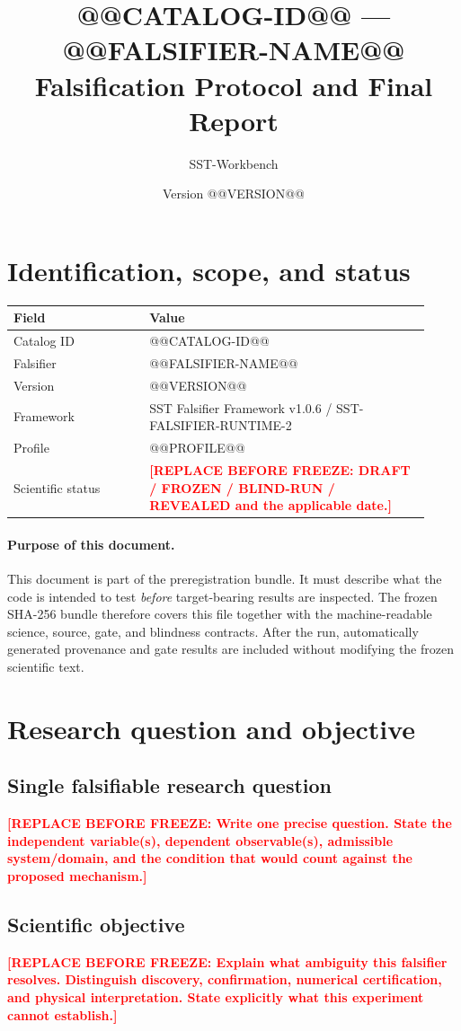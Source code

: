 \documentclass[11pt,a4paper]{article}
\title{@@CATALOG-ID@@ --- @@FALSIFIER-NAME@@\\Falsification Protocol and Final Report}
\author{SST-Workbench}
\date{Version @@VERSION@@}
\newcommand{\SSTTODO}[1]{\ifmmode\text{\color{red}\bfseries TODO}\else\textcolor{red}{\textbf{[REPLACE BEFORE FREEZE: #1]}}\fi}
\begin{document}
\maketitle

\section{Identification, scope, and status}
\begin{longtable}{p{0.30\linewidth}p{0.62\linewidth}}
\toprule
Field & Value \\
\midrule
Catalog ID & @@CATALOG-ID@@ \\
Falsifier & @@FALSIFIER-NAME@@ \\
Version & @@VERSION@@ \\
Framework & SST Falsifier Framework v1.0.6 / SST-FALSIFIER-RUNTIME-2 \\
Profile & @@PROFILE@@ \\
Scientific status & \SSTTODO{DRAFT / FROZEN / BLIND-RUN / REVEALED and the applicable date.} \\
\bottomrule
\end{longtable}

\paragraph{Purpose of this document.}
This document is part of the preregistration bundle. It must describe what the code is intended to test \emph{before} target-bearing results are inspected. The frozen SHA-256 bundle therefore covers this file together with the machine-readable science, source, gate, and blindness contracts. After the run, automatically generated provenance and gate results are included without modifying the frozen scientific text.

\section{Research question and objective}
\subsection{Single falsifiable research question}
\SSTTODO{Write one precise question. State the independent variable(s), dependent observable(s), admissible system/domain, and the condition that would count against the proposed mechanism.}

\subsection{Scientific objective}
\SSTTODO{Explain what ambiguity this falsifier resolves. Distinguish discovery, confirmation, numerical certification, and physical interpretation. State explicitly what this experiment cannot establish.}
\end{document}

